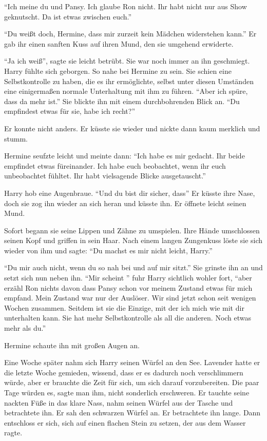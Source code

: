 \enquote{Ich meine du und Pansy. Ich glaube Ron nicht. Ihr habt nicht nur aus Show geknutscht. Da ist etwas zwischen euch.}

\enquote{Du weißt doch, Hermine, dass mir zurzeit kein Mädchen widerstehen kann.} Er gab ihr einen sanften Kuss auf ihren Mund, den sie umgehend erwiderte.

\enquote{Ja ich weiß}, sagte sie leicht betrübt. Sie war noch immer an ihn geschmiegt. Harry fühlte sich geborgen. So nahe bei Hermine zu sein. Sie schien eine Selbstkontrolle zu haben, die es ihr ermöglichte, selbst unter diesen Umständen eine einigermaßen normale Unterhaltung mit ihm zu führen. \enquote{Aber ich spüre, dass da mehr ist.} Sie blickte ihn mit einem durchbohrenden Blick an. \enquote{Du empfindest etwas für sie, habe ich recht?}

Er konnte nicht anders. Er küsste sie wieder und nickte dann kaum merklich und stumm.

Hermine seufzte leicht und meinte dann: \enquote{Ich habe es mir gedacht. Ihr beide empfindet etwas füreinander. Ich habe euch beobachtet, wenn ihr euch unbeobachtet fühltet. Ihr habt vielsagende Blicke ausgetauscht.}

Harry hob eine Augenbraue. \enquote{Und du bist dir sicher, dass\abs} Er küsste ihre Nase, doch sie zog ihn wieder an sich heran und küsste ihn. Er öffnete leicht seinen Mund.

Sofort begann sie seine Lippen und Zähne zu umspielen. Ihre Hände umschlossen seinen Kopf und griffen in sein Haar. Nach einem langen Zungenkuss löste sie sich wieder von ihm und sagte: \enquote{Du machst es mir nicht leicht, Harry.}

\enquote{Du mir auch nicht, wenn du so nah bei und auf mir sitzt.} Sie grinste ihn an und setzt sich nun neben ihn. \enquote{Mir scheint \gst } fuhr Harry sichtlich wohler fort, \enquote{aber erzähl Ron nichts davon \gst dass Pansy schon vor meinem Zustand etwas für mich empfand. Mein Zustand war nur der Auslöser. Wir sind jetzt schon seit wenigen Wochen zusammen. Seitdem ist sie die Einzige, mit der ich mich wie mit dir unterhalten kann. Sie hat mehr Selbstkontrolle als all die anderen. Noch etwas mehr als du.}

Hermine schaute ihn mit großen Augen an.

\trenn

Eine Woche später nahm sich Harry seinen Würfel an den See. Lavender hatte er die letzte Woche gemieden, wissend, dass er es dadurch noch verschlimmern würde, aber er brauchte die Zeit für sich, um sich darauf vorzubereiten. Die paar Tage würden es, sagte man ihm, nicht sonderlich erschweren. Er tauchte seine nackten Füße in das klare Nass, nahm seinen Würfel aus der Tasche und betrachtete ihn. Er sah den schwarzen Würfel an. Er betrachtete ihn lange. Dann entschloss er sich, sich auf einen flachen Stein zu setzen, der aus dem Wasser ragte.


